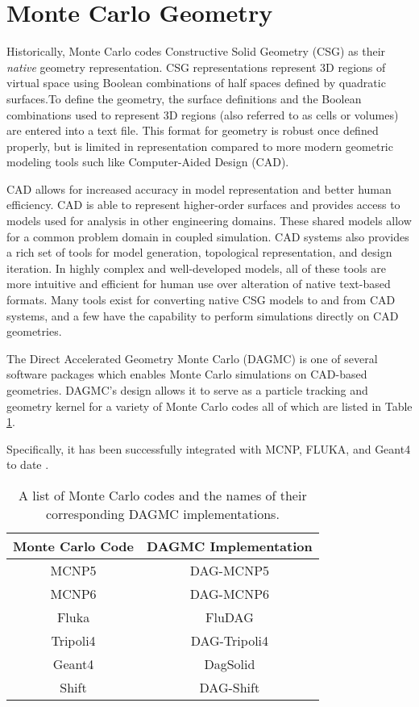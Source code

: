 \section{Monte Carlo Geometry}


Historically, Monte Carlo codes Constructive Solid Geometry (CSG) as their
\textit{native} geometry representation. CSG representations represent 3D
regions of virtual space using Boolean combinations of half spaces defined by
quadratic surfaces.To define the geometry, the surface definitions and the
Boolean combinations used to represent 3D regions (also referred to as cells or
volumes) are entered into a text file. This format for geometry is robust once
defined properly, but is limited in representation compared to more modern
geometric modeling tools such like Computer-Aided Design (CAD).

CAD allows for increased accuracy in model representation and better human
efficiency. CAD is able to represent higher-order surfaces and provides access
to models used for analysis in other engineering domains. These shared models
allow for a common problem domain in coupled simulation. CAD systems also provides a
rich set of tools for model generation, topological representation, and design
iteration. In highly complex and well-developed models, all of these tools are
more intuitive and efficient for human use over alteration of native text-based
formats. Many tools exist for converting native CSG models to and from CAD
systems, and a few have the capability to perform simulations directly on CAD
geometries.

The Direct Accelerated Geometry Monte Carlo (DAGMC) \cite{Tautges_2009} is one
of several software packages which enables Monte Carlo simulations on CAD-based
geometries. DAGMC's design allows it to serve as a particle
tracking and geometry kernel for a variety of Monte Carlo codes all of which are
listed in Table \ref{tab:dagmc_implementations}.

Specifically, it has been successfully integrated with MCNP, FLUKA, and Geant4
to date \cite{LANL_MCNP5_VOLIII, Bohlen_2014, GEANT4_2003}.

\begin{table}[H]
  \centering
  \begin{tabular}{c c}
    \hline
    Monte Carlo Code & DAGMC Implementation \\
    \hline
    MCNP5            & DAG-MCNP5            \\
    MCNP6            & DAG-MCNP6            \\
    Fluka            & FluDAG               \\
    Tripoli4         & DAG-Tripoli4         \\
    Geant4           & DagSolid             \\
    Shift            & DAG-Shift            \\
    \hline
  \end{tabular}
  \caption{A list of Monte Carlo codes and the names of their corresponding DAGMC implementations.}
  \label{tab:dagmc_implementations}
\end{table}

